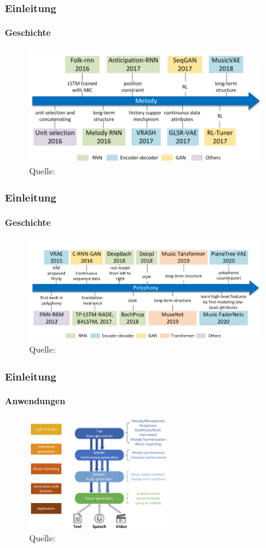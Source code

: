 \documentclass[aspectratio=169]{beamer}
\begin{document}
\begin{frame}
	\frametitle{Einleitung}
	\framesubtitle{Geschichte}
	\begin{figure}
	\includegraphics[width=0.9\textwidth]{melody-generation-chonology}
	\caption{Quelle: \cite{shulei:2020}}
\end{figure}
\end{frame}

\begin{frame}
	\frametitle{Einleitung}
	\framesubtitle{Geschichte}
	\begin{figure}
		\includegraphics[width=0.9\textwidth]{polyphony-generation-chonology}
		\caption{Quelle: \cite{shulei:2020}}
	\end{figure}
\end{frame}

\begin{frame}
	\frametitle{Einleitung}
	\framesubtitle{Anwendungen}
	\begin{figure}
		\includegraphics[width=0.54\textwidth]{possibilities}
		\caption{Quelle: \cite{shulei:2020}}
	\end{figure}
\end{frame}
\end{document}

